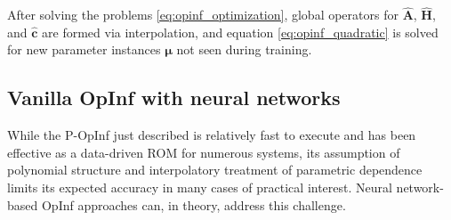 \documentclass[3p,computermodern,11pt]{elsarticle}
\numberwithin{equation}{section}
\newcommand{\reducedOperatorLinear}{\hat{\mathbf{A}}}
\newcommand{\reducedOperatorQuadratic}{\hat{\mathbf{H}}}
\newcommand{\reducedOperatorConstant}{\hat{\mathbf{c}}}
\newcommand{\params}{\boldsymbol \mu}
\newcommand{\irinanote}[1]{\textcolor{blue}{{\bf IKT comment:} \textit{#1}}}
\begin{document}
After solving the problems \eqref{eq:opinf_optimization}, global operators for $\reducedOperatorLinear$, $\reducedOperatorQuadratic$, and $\reducedOperatorConstant$ are formed via interpolation, and equation \eqref{eq:opinf_quadratic} is solved for new parameter instances $\params$ not seen during training. 

\subsection{Vanilla OpInf with neural networks}
While the P-OpInf just described is relatively fast to execute and has been effective as a data-driven ROM for numerous systems, its assumption of polynomial structure and interpolatory treatment of parametric dependence limits its expected accuracy in many cases of practical interest. Neural network-based OpInf approaches can, in theory, address this challenge. 
\end{document}
